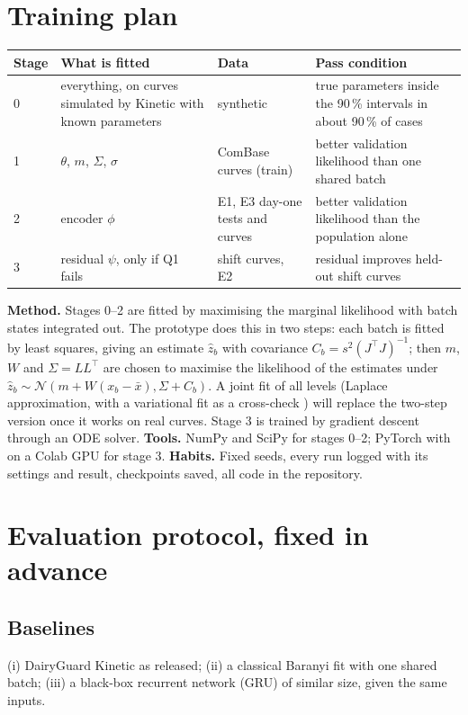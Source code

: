 \section{Training plan}\label{sec:train}
\begin{center}\small\begin{tabular}{@{}p{1.1cm}p{5.4cm}p{3.6cm}p{3.3cm}@{}}\toprule\rowcolor{dghead}
Stage & What is fitted & Data & Pass condition\\\midrule
0 & everything, on curves simulated by Kinetic with known parameters & synthetic & true parameters inside the 90\,\% intervals in about 90\,\% of cases\\
1 & $\theta$, $m$, $\Sigma$, $\sigma$ & ComBase curves (train) & better validation likelihood than one shared batch\\
2 & encoder $\phi$ & E1, E3 day-one tests and curves & better validation likelihood than the population alone\\
3 & residual $\psi$, only if Q1 fails & shift curves, E2 & residual improves held-out shift curves\\
\bottomrule\end{tabular}\end{center}
\textbf{Method.} Stages 0--2 are fitted by maximising the marginal likelihood with batch states integrated out. The prototype does this in two steps: each batch is fitted by least squares, giving an estimate $\hat z_b$ with covariance $C_b=s^2(J^{\top}J)^{-1}$; then $m$, $W$ and $\Sigma=LL^{\top}$ are chosen to maximise the likelihood of the estimates under $\hat z_b\sim\mathcal N(m+W(x_b-\bar x),\Sigma+C_b)$. A joint fit of all levels (Laplace approximation, with a variational fit as a cross-check \cite{kingma2014}) will replace the two-step version once it works on real curves. Stage 3 is trained by gradient descent through an ODE solver. \textbf{Tools.} NumPy and SciPy for stages 0--2; PyTorch with  on a Colab GPU for stage 3. \textbf{Habits.} Fixed seeds, every run logged with its settings and result, checkpoints saved, all code in the repository.

\section{Evaluation protocol, fixed in advance}\label{sec:eval}
\subsection{Baselines}
(i) DairyGuard Kinetic as released; (ii) a classical Baranyi fit with one shared batch; (iii) a black-box recurrent network (GRU) of similar size, given the same inputs.

